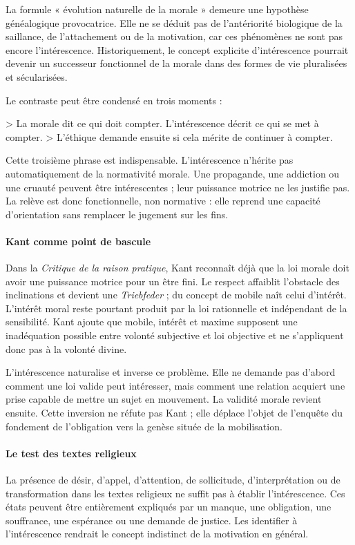 \documentclass[10pt,a4paper]{article}
\begin{document}
La formule « évolution naturelle de la morale » demeure une hypothèse généalogique provocatrice. Elle ne se déduit pas de l'antériorité biologique de la saillance, de l'attachement ou de la motivation, car ces phénomènes ne sont pas encore l'intérescence. Historiquement, le concept explicite d'intérescence pourrait devenir un successeur fonctionnel de la morale dans des formes de vie pluralisées et sécularisées.

Le contraste peut être condensé en trois moments :

> La morale dit ce qui doit compter. L'intérescence décrit ce qui se met à compter. > L'éthique demande ensuite si cela mérite de continuer à compter.

Cette troisième phrase est indispensable. L'intérescence n'hérite pas automatiquement de la normativité morale. Une propagande, une addiction ou une cruauté peuvent être intérescentes ; leur puissance motrice ne les justifie pas. La relève est donc fonctionnelle, non normative : elle reprend une capacité d'orientation sans remplacer le jugement sur les fins.

\paragraph{Kant comme point de bascule}
Dans la \emph{Critique de la raison pratique}, Kant reconnaît déjà que la loi morale doit avoir une puissance motrice pour un être fini. Le respect affaiblit l'obstacle des inclinations et devient une \emph{Triebfeder} ; du concept de mobile naît celui d'intérêt. L'intérêt moral reste pourtant produit par la loi rationnelle et indépendant de la sensibilité. Kant ajoute que mobile, intérêt et maxime supposent une inadéquation possible entre volonté subjective et loi objective et ne s'appliquent donc pas à la volonté divine.

L'intérescence naturalise et inverse ce problème. Elle ne demande pas d'abord comment une loi valide peut intéresser, mais comment une relation acquiert une prise capable de mettre un sujet en mouvement. La validité morale revient ensuite. Cette inversion ne réfute pas Kant ; elle déplace l'objet de l'enquête du fondement de l'obligation vers la genèse située de la mobilisation.

\paragraph{Le test des textes religieux}
La présence de désir, d'appel, d'attention, de sollicitude, d'interprétation ou de transformation dans les textes religieux ne suffit pas à établir l'intérescence. Ces états peuvent être entièrement expliqués par un manque, une obligation, une souffrance, une espérance ou une demande de justice. Les identifier à l'intérescence rendrait le concept indistinct de la motivation en général.
\end{document}
